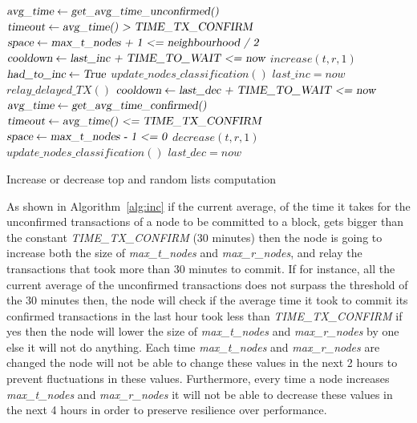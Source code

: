 \documentclass{dads}   %
\begin{document}
\begin{algorithm}[t]
\begin{algorithmic}[1]
\State $\textsl{avg\_time} \gets \textsl{get\_avg\_time\_unconfirmed()}$
\State $\textsl{timeout} \gets \textsl{avg\_time() > TIME\_TX\_CONFIRM}$
\State $\textsl{space} \gets \textsl{max\_t\_nodes + 1 <= neighbourhood / 2}$
\State $\textsl{cooldown} \gets \textsl{last\_inc + TIME\_TO\_WAIT <= now}$
  \State $increase(t, r, 1)$
  \State $\textsl{had\_to\_inc} \gets \textsl{True}$
  \State $update\_nodes\_classification()$
  \State $last\_inc = now$
  \State $relay\_delayed\_TX()$
\EndIf
\State $\textsl{cooldown} \gets \textsl{last\_dec + TIME\_TO\_WAIT <= now}$
  \State $\textsl{avg\_time} \gets \textsl{get\_avg\_time\_confirmed()}$
  \State $\textsl{timeout} \gets \textsl{avg\_time() <= TIME\_TX\_CONFIRM}$
  \State $\textsl{space} \gets \textsl{max\_t\_nodes - 1 <= 0}$
    \State $decrease(t, r, 1)$
    \State $update\_nodes\_classification()$
    \State $last\_dec = now$
  \EndIf
\EndIf
\EndFunction
\end{algorithmic}
\caption{Increase or decrease top and random lists computation}
\label{alg:inc}
\end{algorithm}

As shown in Algorithm~\ref{alg:inc} if the current average, of the time it takes for the unconfirmed transactions of a node to be committed to a block, gets bigger than the constant \textsl{TIME\_TX\_CONFIRM} (30 minutes) then the node is going to increase both the size of \textsl{max\_t\_nodes} and \textsl{max\_r\_nodes}, and relay the transactions that took more than 30 minutes to commit. If for instance, all the current average of the unconfirmed transactions does not surpass the threshold of the 30 minutes then, the node will check if the average time it took to commit its confirmed transactions in the last hour took less than \textsl{TIME\_TX\_CONFIRM} if yes then the node will lower the size of \textsl{max\_t\_nodes} and \textsl{max\_r\_nodes} by one else it will not do anything. Each time \textsl{max\_t\_nodes} and \textsl{max\_r\_nodes} are changed the node will not be able to change these values in the next 2 hours to prevent fluctuations in these values. Furthermore, every time a node increases \textsl{max\_t\_nodes} and \textsl{max\_r\_nodes} it will not be able to decrease these values in the next 4 hours in order to preserve resilience over performance.
\end{document}

